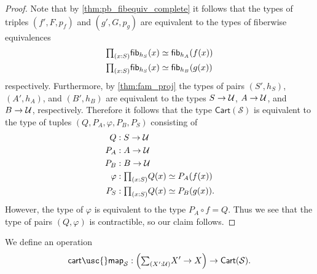 \begin{proof}
Note that by \cref{thm:pb_fibequiv_complete} it follows that the types of triples $(f',F,p_f)$ and $(g',G,p_g)$ are equivalent to the types of fiberwise equivalences
\begin{align*}
& \prd{x:S}\eqv{\fib{h_S}{x}}{\fib{h_A}{f(x)}} \\
& \prd{x:S}\eqv{\fib{h_S}{x}}{\fib{h_B}{g(x)}}
\end{align*} 
respectively. Furthermore, by \cref{thm:fam_proj} the types of pairs $(S',h_S)$, $(A',h_A)$, and $(B',h_B)$ are equivalent to the types $S\to \mathcal{U}$, $A\to \mathcal{U}$, and $B\to \mathcal{U}$, respectively. Therefore it follows that the type $\mathsf{Cart}(\mathcal{S})$ is equivalent to the type of tuples $(Q,P_A,\varphi,P_B,P_S)$ consisting of
\begin{align*}
Q & : S\to \UU \\
P_A & : A \to \UU \\
P_B & : B \to \UU \\
\varphi & : \prd{x:S}\eqv{Q(x)}{P_A(f(x))} \\
P_S & : \prd{x:S}\eqv{Q(x)}{P_B(g(x))}.
\end{align*}
However, the type of $\varphi$ is equivalent to the type $P_A\circ f=Q$. Thus we see that the type of pairs $(Q,\varphi)$ is contractible, so our claim follows.
\end{proof}

\begin{defn}
We define an operation
\begin{equation*}
\mathsf{cart\usc{}map}_{\mathcal{S}}:{\Big(\sm{X':\UU}X'\to X\Big)}\to \mathsf{Cart}(\mathcal{S}).
\end{equation*}
\end{defn}

